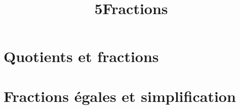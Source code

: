 \documentclass[12pt,a4paper]{article}
\date{}
\title{\textcircled{{\normalsize{5}}}Fractions}
\begin{document}
	\maketitle








\vspace{-0.5cm}

\section{Quotients et fractions}



%
%

\section{Fractions égales et simplification}



%
%
%

%
\end{document}
